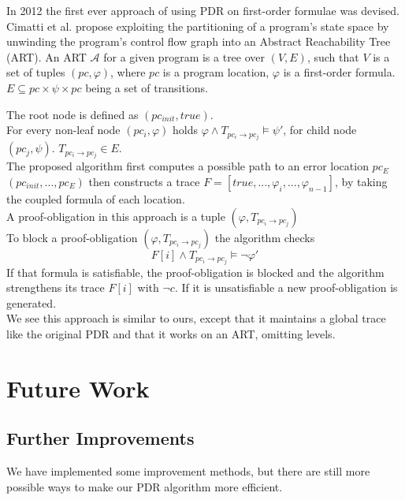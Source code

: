 \documentclass[11pt, a4paper, BCOR=10mm, ngerman]{scrbook}
\begin{document}
In 2012 the first ever approach of using PDR on first-order formulae was devised. Cimatti et al. \cite{DBLP:conf/cav/CimattiG12} propose exploiting the partitioning of a program's state space by unwinding the program's control flow graph into an Abstract Reachability Tree (ART). An ART $\mathcal{A}$ for a given program is a tree over $(V, E)$, such that $V$ is a set of tuples $(pc, \varphi)$, where $pc$ is a program location,  $\varphi$ is a first-order formula. $E \subseteq pc \times \psi \times pc$ being a set of transitions. \par
The root node is defined as $(pc_{init}, true)$. \\ For every non-leaf node $(pc_i, \varphi)$ holds $\varphi \land T_{pc_i \rightarrow pc_j} \models \psi'$, for child node $(pc_j, \psi)$. $T_{pc_i \rightarrow pc_j} \in E$. \\
The proposed algorithm first computes a possible path to an error location $pc_E$ $(pc_{init}, ..., pc_E)$ then constructs a trace $F = [ true, ..., \varphi_i, ..., \varphi_{n-1} ] $, by taking the coupled formula of each location. \\
A proof-obligation in this approach is a tuple $(\varphi, T_{pc_i \rightarrow pc_j})$ \\
To block a proof-obligation $(\varphi, T_{pc_i \rightarrow pc_j})$ the algorithm checks 
\begin{equation*}
F[i] \land T_{pc_i \rightarrow pc_j} \models \neg \varphi'
\end{equation*}
If that formula is satisfiable, the proof-obligation is blocked and the algorithm strengthens its trace $F[i]$ with $\neg c$. If it is unsatisfiable a new proof-obligation is generated. \\
We see this approach is similar to ours, except that it maintains a global trace like the original PDR and that it works on an ART, omitting levels. \par




\chapter{Future Work}
\section{Further Improvements}
We have implemented some improvement methods, but there are still more possible ways to make our PDR algorithm more efficient.
\end{document}
